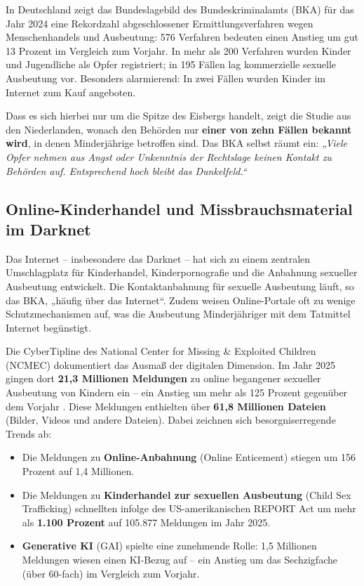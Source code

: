 \documentclass[11pt,a4paper]{article}
\begin{document}
	In Deutschland zeigt das Bundeslagebild des Bundeskriminalamts (BKA) für das Jahr 2024 eine Rekordzahl abgeschlossener Ermittlungsverfahren wegen Menschenhandels und Ausbeutung: 576 Verfahren bedeuten einen Anstieg um gut 13 Prozent im Vergleich zum Vorjahr. In mehr als 200 Verfahren wurden Kinder und Jugendliche als Opfer registriert; in 195 Fällen lag kommerzielle sexuelle Ausbeutung vor. Besonders alarmierend: In zwei Fällen wurden Kinder im Internet zum Kauf angeboten.
	
	Dass es sich hierbei nur um die Spitze des Eisbergs handelt, zeigt die Studie aus den Niederlanden, wonach den Behörden nur \textbf{einer von zehn Fällen bekannt wird}, in denen Minderjährige betroffen sind. Das BKA selbst räumt ein: \textit{„Viele Opfer nehmen aus Angst oder Unkenntnis der Rechtslage keinen Kontakt zu Behörden auf. Entsprechend hoch bleibt das Dunkelfeld.“}
	
	\subsection{Online-Kinderhandel und Missbrauchsmaterial im Darknet}
	
	Das Internet – insbesondere das Darknet – hat sich zu einem zentralen Umschlagplatz für Kinderhandel, Kinderpornografie und die Anbahnung sexueller Ausbeutung entwickelt. Die Kontaktanbahnung für sexuelle Ausbeutung läuft, so das BKA, „häufig über das Internet“. Zudem weisen Online-Portale oft zu wenige Schutzmechanismen auf, was die Ausbeutung Minderjähriger mit dem Tatmittel Internet begünstigt.
	
	Die CyberTipline des National Center for Missing \& Exploited Children (NCMEC) dokumentiert das Ausmaß der digitalen Dimension. Im Jahr 2025 gingen dort \textbf{21,3 Millionen Meldungen} zu online begangener sexueller Ausbeutung von Kindern ein – ein Anstieg um mehr als 125 Prozent gegenüber dem Vorjahr \cite{ncmec2025}. Diese Meldungen enthielten über \textbf{61,8 Millionen Dateien} (Bilder, Videos und andere Dateien). Dabei zeichnen sich besorgniserregende Trends ab:
	\begin{itemize}
		\item Die Meldungen zu \textbf{Online-Anbahnung} (Online Enticement) stiegen um 156 Prozent auf 1,4 Millionen.
		\item Die Meldungen zu \textbf{Kinderhandel zur sexuellen Ausbeutung} (Child Sex Trafficking) schnellten infolge des US-amerikanischen REPORT Act um mehr als \textbf{1.100 Prozent} auf 105.877 Meldungen im Jahr 2025.
		\item \textbf{Generative KI} (GAI) spielte eine zunehmende Rolle: 1,5 Millionen Meldungen wiesen einen KI-Bezug auf – ein Anstieg um das Sechzigfache (über 60-fach) im Vergleich zum Vorjahr.
	\end{itemize}
	
\end{document}

